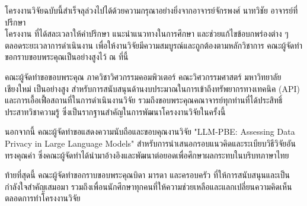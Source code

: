 %

\begin{acknowledgments}

โครงงานวิจัยฉบับนี้สำเร็จลุล่วงไปได้ด้วยความกรุณาอย่างยิ่งจากอาจารย์จักรพงศ์ นาทวิชัย 
อาจารย์ที่ปรึกษา
\\ โครงงาน ที่ได้สละเวลาให้คำปรึกษา แนะนำแนวทางในการศึกษา และช่วยแก้ไขข้อบกพร่องต่าง ๆ ตลอดระยะเวลาการดำเนินงาน เพื่อให้งานวิจัยมีความสมบูรณ์และถูกต้องตามหลักวิชาการ คณะผู้จัดทำขอกราบขอบพระคุณเป็นอย่างสูงไว้ ณ ที่นี้

คณะผู้จัดทำขอขอบพระคุณ ภาควิชาวิศวกรรมคอมพิวเตอร์ คณะวิศวกรรมศาสตร์ มหาวิทยาลัยเชียงใหม่ เป็นอย่างสูง สำหรับการสนับสนุนด้านงบประมาณในการเข้าถึงทรัพยากรทางเทคนิค (API) และการเอื้อเฟื้อสถานที่ในการดำเนินงานวิจัย  รวมถึงขอบพระคุณคณาจารย์ทุกท่านที่ได้ประสิทธิ์ประสาทวิชาความรู้ ซึ่งเป็นรากฐานสำคัญในการพัฒนาโครงงานวิจัยในครั้งนี้

นอกจากนี้ คณะผู้จัดทำขอแสดงความนับถือและขอบคุณงานวิจัย "LLM-PBE: Assessing Data Privacy in Large Language Models" สำหรับการนำเสนอกรอบแนวคิดและระเบียบวิธีวิจัยอันทรงคุณค่า ซึ่งคณะผู้จัดทำได้นำมาอ้างอิงและพัฒนาต่อยอดเพื่อศึกษาผลกระทบในบริบทภาษาไทย 

ท้ายที่สุดนี้ คณะผู้จัดทำขอกราบขอบพระคุณบิดา มารดา และครอบครัว ที่ให้การสนับสนุนและเป็นกำลังใจสำคัญเสมอมา รวมถึงเพื่อนนักศึกษาทุกคนที่ให้ความช่วยเหลือและแลกเปลี่ยนความคิดเห็นตลอดการทำโครงงานวิจัย

\end{acknowledgments}%
\fi %

\contentspage

\ifproject
\figurelistpage

\tablelistpage
\fi %



